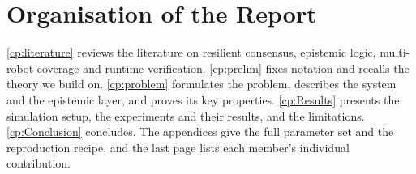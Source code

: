 \section{Organisation of the Report}

\autoref{cp:literature} reviews the literature on resilient consensus, epistemic logic, multi-robot coverage and
runtime verification. \autoref{cp:prelim} fixes notation and recalls the theory we build on. \autoref{cp:problem}
formulates the problem, describes the system and the epistemic layer, and proves its key properties.
\autoref{cp:Results} presents the simulation setup, the experiments and their results, and the limitations.
\autoref{cp:Conclusion} concludes. The appendices give the full parameter set and the reproduction recipe, and the
last page lists each member's individual contribution.
